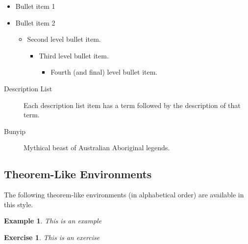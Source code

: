 \documentclass{book}\usepackage{knitr}
\newtheorem{acknowledgement}[theorem]{Acknowledgement}
\newtheorem{example}[theorem]{Example}
\newtheorem{exercise}[theorem]{Exercise}
\newenvironment{proof}[1][Proof]{\textbf{#1.} }{\ \rule{0.5em}{0.5em}}
\begin{document}
\begin{itemize}
\item Bullet item 1

\item Bullet item 2

\begin{itemize}
\item Second level bullet item.

\begin{itemize}
\item Third level bullet item.

\begin{itemize}
\item Fourth (and final) level bullet item.
\end{itemize}
\end{itemize}
\end{itemize}
\end{itemize}

\begin{description}
\item[Description List] Each description list item has a term followed by the
description of that term.

\item[Bunyip] Mythical beast of Australian Aboriginal legends.
\end{description}

\subsection{Theorem-Like Environments}

The following theorem-like environments (in alphabetical order) are available
in this style.


\begin{example}
This is an example
\end{example}

\begin{exercise}
This is an exercise
\end{exercise}



\end{document}
